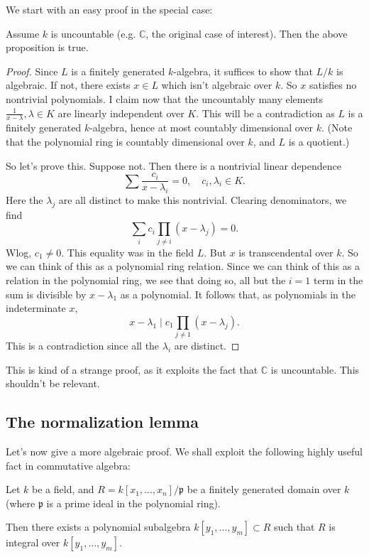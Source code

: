 We start with an easy proof in the special case:
\begin{lemma} 
Assume $k$ is uncountable (e.g. $\mathbb{C}$, the original case of interest).
Then the above proposition is true. 
\end{lemma} 
\begin{proof} 
Since $L$ is a finitely generated $k$-algebra, it suffices to show that $L/k$ is algebraic.
If not, there exists $x \in L$ which isn't algebraic over $k$. So $x$ satisfies
no nontrivial polynomials. 
I claim now that the uncountably many elements $\frac{1}{x-\lambda}, \lambda \in K$ are linearly
independent over $K$. This will be a contradiction as $L$ is a finitely
generated $k$-algebra, hence at most countably dimensional over $k$. (Note that
the polynomial ring is countably dimensional over $k$, and $L$ is a quotient.)

So let's prove this. Suppose not. Then there is a nontrivial linear dependence
\[ \sum \frac{c_i}{x - \lambda_i}  = 0, \quad c_i, \lambda_i \in K. \]
Here the $\lambda_j$ are all distinct to make this nontrivial. Clearing denominators, we find
\[ \sum_i c_i \prod_{j \neq i } (x- \lambda_j) = 0. \]
Wlog, $c_1 \neq 0$. 
This equality was in the field $L$. But $x$ is transcendental over $k$. So we
can think of this as a polynomial ring relation. 
Since we can think of this as a relation in the polynomial ring, we see that
doing so, all but the $i =1$ term in the sum is divisible by $x - \lambda_1$
as a polynomial.
It follows that, as polynomials in the indeterminate $x$, 
\[ x - \lambda_1 \mid c_1 \prod_{j \neq 1} (x - \lambda_j).  \]
This is a contradiction since all the $\lambda_i$ are distinct.
\end{proof} 

This is kind of a strange proof, as it exploits the fact that $\mathbb{C}$ is
uncountable. 
This shouldn't be relevant.

\subsection{The normalization lemma}

Let's now give a more algebraic proof. 
We shall exploit the following highly useful fact in commutative algebra:

\begin{theorem} Let $k$ be a field, and $R =
k[x_1, \dots, x_n]/\mathfrak{p}$ be a finitely generated domain over $k$ (where
$\mathfrak{p}$ is a prime ideal in the polynomial ring).

Then there exists a polynomial subalgebra $k[y_1, \dots, y_m] \subset R$ such
that $R$ is integral over $k[y_1, \dots, y_m]$. 
\end{theorem} 

